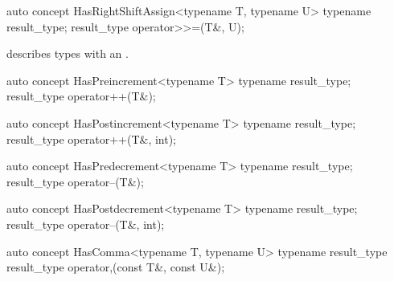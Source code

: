 \documentclass[american,twoside]{book}
\begin{document}
\begin{itemdecl}
auto concept HasRightShiftAssign<typename T, typename U> {
  typename result_type;
  result_type operator>>=(T&, U);
}
\end{itemdecl}

\begin{itemdescr}
\pnum
\mbox{\reallynote} describes types with an \mbox{}.
\end{itemdescr}

\begin{itemdecl}
auto concept HasPreincrement<typename T> {
  typename result_type;
  result_type operator++(T&);
}
\end{itemdecl}

\begin{itemdescr}
\pnum
{}
\end{itemdescr}

\begin{itemdecl}
auto concept HasPostincrement<typename T> {
  typename result_type;
  result_type operator++(T&, int);
}
\end{itemdecl}

\begin{itemdescr}
\pnum
{}
\end{itemdescr}

\begin{itemdecl}
auto concept HasPredecrement<typename T> {
  typename result_type;
  result_type operator--(T&);
}
\end{itemdecl}

\begin{itemdescr}
\pnum
{}
\end{itemdescr}

\begin{itemdecl}
auto concept HasPostdecrement<typename T> {
  typename result_type;
  result_type operator--(T&, int);
}
\end{itemdecl}

\begin{itemdescr}
\pnum
{}
\end{itemdescr}

\begin{itemdecl}
auto concept HasComma<typename T, typename U> {
  typename result_type
  result_type operator,(const T&, const U&);
}
\end{itemdecl}
\end{document}
